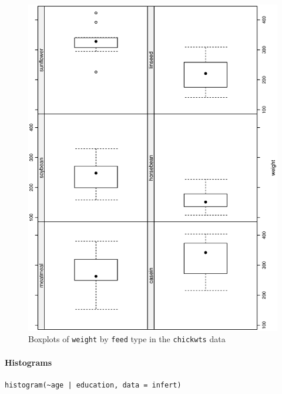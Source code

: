 \documentclass[captions=tableheading]{scrbook}
\begin{document}
\begin{figure}[th]
    \includegraphics[angle=270, totalheight=4in]{img/bwplot.ps}
    \caption{Boxplots of \texttt{weight} by \texttt{feed} type in the \texttt{chickwts} data}
    \label{fig:bwplot}
  \end{figure}


\paragraph*{Histograms}


\begin{verbatim}
histogram(~age | education, data = infert)
\end{verbatim}
\end{document}

